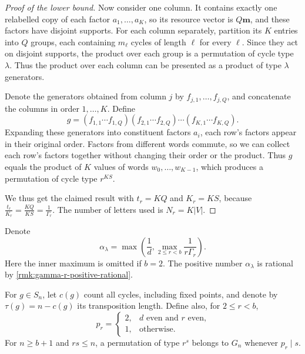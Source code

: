 \documentclass[DIV=12,10pt]{scrartcl}
\theoremstyle{definition}
\newcommand{\mvec}{\mathbf{m}}
\begin{document}
\begin{proof}[Proof of the lower bound]
Now consider one column. It contains exactly one relabelled copy of each factor $a_1,\ldots,a_K$, so its resource vector is $Q\mvec$, and these factors have disjoint supports. For each column separately, partition its $K$ entries into $Q$ groups, each containing $m_\ell$ cycles of length $\ell$ for every $\ell$. Since they act on disjoint supports, the product over each group is a permutation of cycle type $\lambda$. Thus the product over each column can be presented as a product of type $\lambda$ generators.

Denote the generators obtained from column $j$ by $f_{j,1},\ldots,f_{j,Q}$, and concatenate the columns in order $1,\ldots,K$. Define
\[
	g = (f_{1,1}\cdots f_{1,Q})(f_{2,1}\cdots f_{2,Q})\cdots(f_{K,1}\cdots f_{K,Q}).
\]
Expanding these generators into constituent factors $a_i$, each row's factors appear in their original order. Factors from different words commute, so we can collect each row's factors together without changing their order or the product. Thus $g$ equals the product of $K$ values of words $w_0,\ldots,w_{K-1}$, which produces a permutation of cycle type $r^{KS}$.

We thus get the claimed result with $t_r=KQ$ and $K_r=KS$, because $\frac{t_r}{K_r} = \frac{KQ}{KS} = \frac{1}{\Gamma_r}$. The number of letters used is $N_r=K|V|$.
\end{proof}

Denote
\begin{equation}
	\label{eq:common-slope}
	\alpha_\lambda = \max\left( \frac{1}{d}, \max_{2\leqslant r < b} \frac{1}{r\Gamma_r} \right).
\end{equation}
Here the inner maximum is omitted if $b=2$. The positive number $\alpha_\lambda$ is rational by \cref{rmk:gamma-r-positive-rational}.

For $g\in S_n$, let $c(g)$ count all cycles, including fixed points, and denote by $\tau(g)=n-c(g)$ its transposition length. Define also, for $2\leqslant r < b$,
\[
	p_r = \begin{cases}
		2, & \text{$d$ even and $r$ even,} \\
		1, & \text{otherwise.}
	\end{cases}
\]
For $n\geqslant b+1$ and $rs\leqslant n$, a permutation of type $r^s$ belongs to $G_n$ whenever $p_r\mid s$.
\end{document}
